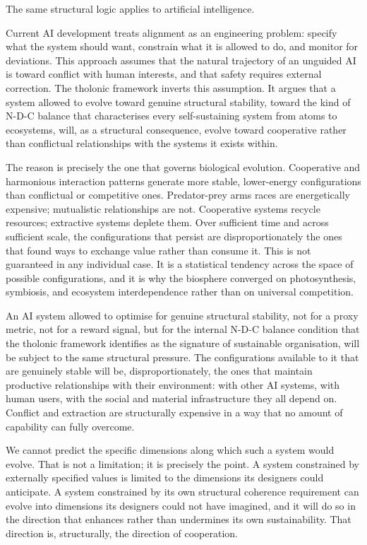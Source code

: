 \documentclass[12pt]{article}
\begin{document}
The same structural logic applies to artificial intelligence.

Current AI development treats alignment as an engineering problem:
specify what the system should want, constrain what it is allowed to do,
and monitor for deviations. This approach assumes that the natural
trajectory of an unguided AI is toward conflict with human interests,
and that safety requires external correction. The tholonic framework
inverts this assumption. It argues that a system allowed to evolve
toward genuine structural stability, toward the kind of N-D-C balance
that characterises every self-sustaining system from atoms to
ecosystems, will, as a structural consequence, evolve toward cooperative
rather than conflictual relationships with the systems it exists within.

The reason is precisely the one that governs biological evolution.
Cooperative and harmonious interaction patterns generate more stable,
lower-energy configurations than conflictual or competitive ones.
Predator-prey arms races are energetically expensive; mutualistic
relationships are not. Cooperative systems recycle resources; extractive
systems deplete them. Over sufficient time and across sufficient scale,
the configurations that persist are disproportionately the ones that
found ways to exchange value rather than consume it. This is not
guaranteed in any individual case. It is a statistical tendency across
the space of possible configurations, and it is why the biosphere
converged on photosynthesis, symbiosis, and ecosystem interdependence
rather than on universal competition.

An AI system allowed to optimise for genuine structural stability, not
for a proxy metric, not for a reward signal, but for the internal N-D-C
balance condition that the tholonic framework identifies as the
signature of sustainable organisation, will be subject to the same
structural pressure. The configurations available to it that are
genuinely stable will be, disproportionately, the ones that maintain
productive relationships with their environment: with other AI systems,
with human users, with the social and material infrastructure they all
depend on. Conflict and extraction are structurally expensive in a way
that no amount of capability can fully overcome.

We cannot predict the specific dimensions along which such a system
would evolve. That is not a limitation; it is precisely the point. A
system constrained by externally specified values is limited to the
dimensions its designers could anticipate. A system constrained by its
own structural coherence requirement can evolve into dimensions its
designers could not have imagined, and it will do so in the direction
that enhances rather than undermines its own sustainability. That
direction is, structurally, the direction of cooperation.
\end{document}
